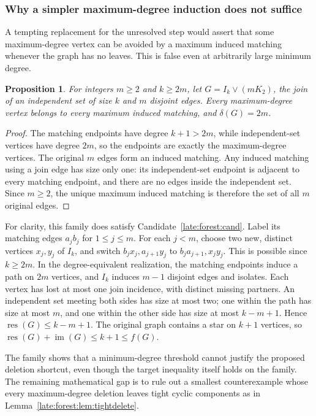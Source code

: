 \documentclass[11pt,a4paper]{article}
\newtheorem{proposition}[theorem]{Proposition}
\theoremstyle{definition}\newtheorem{definition}[theorem]{Definition}
\theoremstyle{remark}\newtheorem{remark}[theorem]{Remark}
\newcommand{\res}{\operatorname{res}}
\newcommand{\im}{\operatorname{im}}
\begin{document}
\subsubsection{Why a simpler maximum-degree induction does not suffice}

A tempting replacement for the unresolved step would assert that some
maximum-degree vertex can be avoided by a maximum induced matching whenever
the graph has no leaves. This is false even at arbitrarily large minimum
degree.

\begin{proposition}\label{late:forest:prop:retired}
For integers $m\ge2$ and $k\ge2m$, let
$G=I_k\vee(mK_2)$, the join of an independent set of size $k$ and $m$ disjoint
edges. Every maximum-degree vertex belongs to every maximum induced matching,
and $\delta(G)=2m$.
\end{proposition}
\begin{proof}
The matching endpoints have degree $k+1>2m$, while independent-set vertices
have degree $2m$, so the endpoints are exactly the maximum-degree vertices.
The original $m$ edges form an induced matching. Any induced matching using
a join edge has size only one: its independent-set endpoint is adjacent to
every matching endpoint, and there are no edges inside the independent set.
Since $m\ge2$, the unique maximum induced matching is therefore the set of all
$m$ original edges.
\end{proof}

For clarity, this family does satisfy Candidate~\ref{late:forest:cand}. Label its matching
edges $a_jb_j$ for $1\le j\le m$. For each $j<m$, choose two new, distinct
vertices $x_j,y_j$ of $I_k$, and switch
$b_jx_j,a_{j+1}y_j$ to $b_ja_{j+1},x_jy_j$. This is possible since
$k\ge2m$. In the degree-equivalent realization, the matching endpoints induce
a path on $2m$ vertices, and $I_k$ induces $m-1$ disjoint edges and isolates.
Each vertex has lost at most one join incidence, with distinct missing
partners. An independent set meeting both sides has size at most two; one
within the path has size at most $m$, and one within the other side has size
at most $k-m+1$. Hence $\res(G)\le k-m+1$. The original graph contains a star
on $k+1$ vertices, so $\res(G)+\im(G)\le k+1\le f(G)$.

The family shows that a minimum-degree threshold cannot justify the proposed
deletion shortcut, even though the target inequality itself holds on the
family. The remaining mathematical gap is to rule out a smallest
counterexample whose every maximum-degree deletion leaves tight cyclic
components as in Lemma~\ref{late:forest:lem:tightdelete}.
\end{document}
